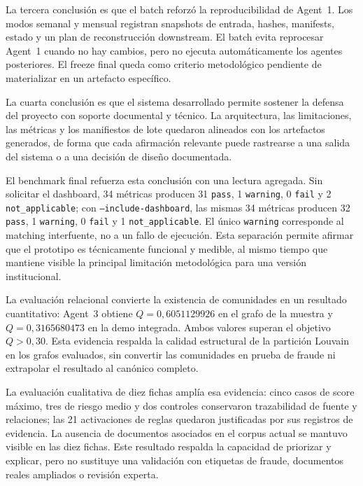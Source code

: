 \documentclass[11pt,a4paper,spanish]{book}
\numberwithin{equation}{chapter}
\numberwithin{figure}{chapter}
\begin{document}
La tercera conclusi{\'o}n es que el batch reforz{\'o} la reproducibilidad de Agent~1. Los modos semanal
y mensual registran snapshots de entrada, hashes, manifests, estado y un plan de reconstrucci{\'o}n
downstream. El batch evita reprocesar Agent~1 cuando no hay cambios, pero no ejecuta autom{\'a}ticamente
los agentes posteriores. El freeze final queda como criterio metodol{\'o}gico pendiente de
materializar en un artefacto espec{\'i}fico.

La cuarta conclusi{\'o}n es que el sistema desarrollado permite sostener la defensa del proyecto con
soporte documental y t{\'e}cnico. La arquitectura, las limitaciones, las m{\'e}tricas y los manifiestos
de lote quedaron alineados con los artefactos generados, de forma que cada afirmaci{\'o}n relevante
puede rastrearse a una salida del sistema o a una decisi{\'o}n de dise{\~n}o documentada.

El benchmark final refuerza esta conclusi{\'o}n con una lectura agregada. Sin solicitar el dashboard,
34 m{\'e}tricas producen 31 \texttt{pass}, 1 \texttt{warning}, 0 \texttt{fail} y 2
\texttt{not\_applicable}; con \texttt{--include-dashboard}, las mismas 34 m{\'e}tricas producen 32
\texttt{pass}, 1 \texttt{warning}, 0 \texttt{fail} y 1 \texttt{not\_applicable}. El
{\'u}nico \texttt{warning} corresponde al matching interfuente, no a un fallo de ejecuci{\'o}n. Esta
separaci{\'o}n permite afirmar que el prototipo es t{\'e}cnicamente funcional y medible, al mismo tiempo
que mantiene visible la principal limitaci{\'o}n metodol{\'o}gica para una versi{\'o}n institucional.

La evaluaci{\'o}n relacional convierte la existencia de comunidades en un resultado cuantitativo:
Agent~3 obtiene $Q=0{,}6051129926$ en el grafo de la muestra y $Q=0{,}3165680473$ en la demo
integrada. Ambos valores superan el objetivo $Q>0{,}30$. Esta evidencia respalda la calidad
estructural de la partici{\'o}n Louvain en los grafos evaluados, sin convertir las comunidades en
prueba de fraude ni extrapolar el resultado al can{\'o}nico completo.

La evaluaci{\'o}n cualitativa de diez fichas ampl{\'i}a esa evidencia: cinco casos de score m{\'a}ximo,
tres de riesgo medio y dos controles conservaron trazabilidad de fuente y relaciones; las 21
activaciones de reglas quedaron justificadas por sus registros de evidencia. La ausencia de
documentos asociados en el corpus actual se mantuvo visible en las diez fichas. Este resultado
respalda la capacidad de priorizar y explicar, pero no sustituye una validaci{\'o}n con etiquetas de
fraude, documentos reales ampliados o revisi{\'o}n experta.
\end{document}
